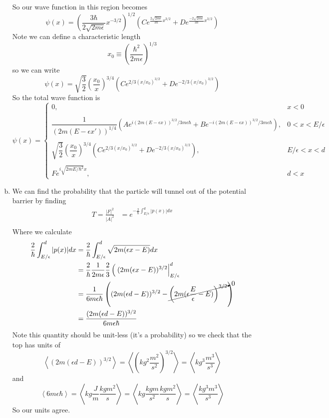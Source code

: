 \documentclass[11pt]{article}
\numberwithin{equation}{section}
\begin{document}
\begin{enumerate}[(a)]
So our wave function in this region becomes
$$\psi(x) = \left(\frac{3\hbar}{2\sqrt{2m\epsilon}}x^{-3/2}\right)^{1/2}\left(Ce^{\frac{2\sqrt{2m\epsilon}}{3\hbar}x^{3/2}} + De^{\frac{-2\sqrt{2m\epsilon}}{3\hbar}x^{3/2}}\right)$$
Note we can define a characteristic length
$$x_0 \equiv \left(\frac{\hbar^2}{2m\epsilon}\right)^{1/3}$$
so we can write
$$\psi(x) = \sqrt{\frac{3}{2}}\left(\frac{x_0}{x}\right)^{3/4}\left(Ce^{2/3(x/x_0)^{3/2}} + De^{-2/3(x/x_0)^{3/2}}\right)$$
So the total wave function is
$$\psi(x) = \left\{\begin{array}{cl}
                   0,                            &x<0\\
\\
                   \dfrac{1}{(2m(E - \epsilon x'))^{1/4}}\left(Ae^{i\left(2m(E - \epsilon x)\right)^{3/2}/3m\epsilon\hbar} + Be^{-i\left(2m(E - \epsilon x)\right)^{3/2}/3m\epsilon\hbar}\right),               &0<x<E/\epsilon\\
\\
            \sqrt{\dfrac{3}{2}}\left(\dfrac{x_0}{x}\right)^{3/4}\left(Ce^{2/3(x/x_0)^{3/2}} + De^{-2/3(x/x_0)^{3/2}}\right),  &E/\epsilon<x<d\\
\\
                   Fe^{i\sqrt{2mE/\hbar^2} x},  &d<x
                   \end{array}\right.$$

\item
We can find the probability that the particle will tunnel out of the potential barrier by finding
\begin{align*}
T = \frac{|F|^2}{|A|^2} &= e^{-\frac{2}{\hbar}\int_{E/\epsilon}^{d}|p(x)|dx}\\
\end{align*}
Where we calculate 
\begin{align*}
\frac{2}{\hbar}\int_{E/\epsilon}^{d}|p(x)|dx &= \frac{2}{\hbar}\int_{E/\epsilon}^{d}\sqrt{2m(\epsilon x - E)}dx \\
&= \frac{2}{\hbar}\frac{1}{2m\epsilon}\frac{2}{3}\left(\frac{}{}(2m(\epsilon x - E))^{3/2}\right|_{E/\epsilon}^{d} \\
&= \frac{1}{6m\epsilon\hbar}\left((2m(\epsilon d - E))^{3/2}-\cancelto{0}{\left(2m(\epsilon \frac{E}{\epsilon} - E)\right)^{3/2}}\right) \\
&= \frac{(2m(\epsilon d - E))^{3/2}}{6m\epsilon\hbar}
\end{align*}
Note this quantity should be unit-less (it's a probability) so we check that the top has units of
$$\left\langle(2m(\epsilon d - E))^{3/2}\right\rangle = \left\langle \left(kg^2\frac{m^2}{s^2}\right)^{3/2}\right\rangle = \left\langle kg^3\frac{m^3}{s^3}\right\rangle $$
and
$$\left\langle 6m\epsilon\hbar\right\rangle = \left\langle kg\frac{J}{m}\frac{kgm^2}{s}\right\rangle = \left\langle kg\frac{kgm}{s^2}\frac{kgm^2}{s}\right\rangle = \left\langle \frac{kg^3m^3}{s^3}\right\rangle $$
So our units agree.
\end{enumerate}
\end{document}

